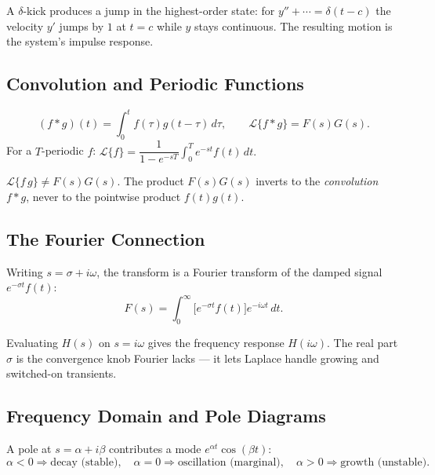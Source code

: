 \begin{conceptbox}
A $\delta$-kick produces a \textcolor{accentorange}{jump in the highest-order state}:
for $y''+\cdots=\delta(t-c)$ the velocity $y'$ jumps by $1$ at $t=c$ while $y$ stays
continuous. The resulting motion is the system's impulse response.
\end{conceptbox}

\subsection{Convolution and Periodic Functions}

\begin{formulabox}
\[ (f*g)(t)=\int_0^t f(\tau)g(t-\tau)\,d\tau, \qquad \mathcal{L}\{f*g\}=F(s)G(s). \]
For a $T$-periodic $f$: \;
$\mathcal{L}\{f\}=\dfrac{1}{1-e^{-sT}}\displaystyle\int_0^T e^{-st}f(t)\,dt.$
\end{formulabox}

\begin{warningbox}
$\mathcal{L}\{f\,g\}\ne F(s)G(s)$. The product $F(s)G(s)$ inverts to the
\emph{convolution} $f*g$, never to the pointwise product $f(t)g(t)$.
\end{warningbox}

\subsection{The Fourier Connection}

Writing $s=\sigma+i\omega$, the transform is a Fourier transform of the damped signal
$e^{-\sigma t}f(t)$:
\[ F(s)=\int_0^\infty \big[e^{-\sigma t}f(t)\big]e^{-i\omega t}\,dt. \]

\begin{conceptbox}
Evaluating $H(s)$ on $s=i\omega$ gives the \textcolor{accentorange}{frequency
response} $H(i\omega)$. The real part $\sigma$ is the convergence knob Fourier lacks
--- it lets Laplace handle growing and switched-on transients.
\end{conceptbox}

\subsection{Frequency Domain and Pole Diagrams}

\begin{formulabox}
A pole at $s=\alpha+i\beta$ contributes a mode $e^{\alpha t}\cos(\beta t)$:
\[
\alpha<0 \Rightarrow \text{decay (stable)}, \quad
\alpha=0 \Rightarrow \text{oscillation (marginal)}, \quad
\alpha>0 \Rightarrow \text{growth (unstable)}.
\]
\end{formulabox}

